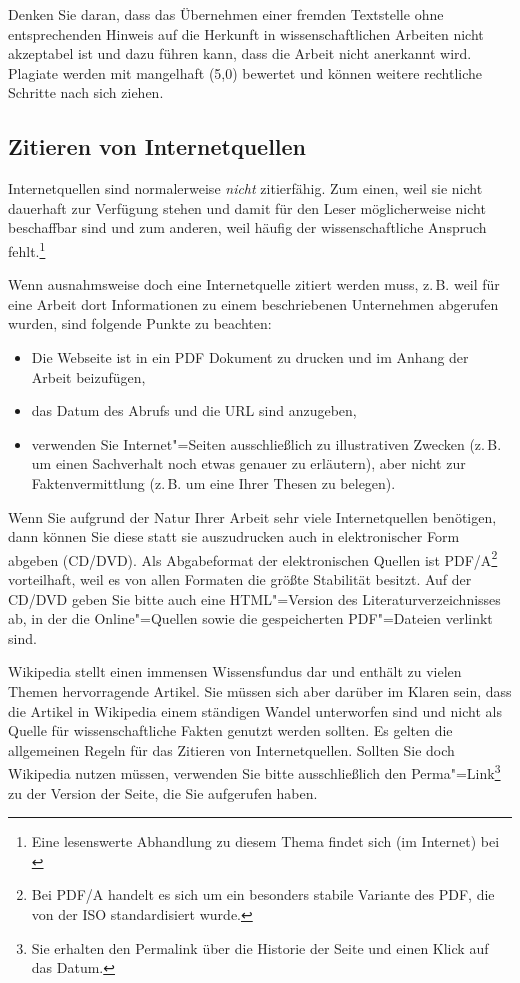 Denken Sie daran, dass das Übernehmen einer fremden Textstelle ohne entsprechenden Hinweis auf die Herkunft in wissenschaftlichen Arbeiten nicht akzeptabel ist und dazu führen kann, dass die Arbeit nicht anerkannt wird. Plagiate werden mit mangelhaft (5,0) bewertet und können weitere rechtliche Schritte nach sich ziehen.


\subsection{Zitieren von Internetquellen}

Internetquellen sind normalerweise \textit{nicht} zitierfähig. Zum einen, weil sie nicht dauerhaft zur Verfügung stehen und damit für den Leser möglicherweise nicht beschaffbar sind und zum anderen, weil häufig der wissenschaftliche Anspruch fehlt.\footnote{Eine lesenswerte Abhandlung zu diesem Thema findet sich (im Internet) bei \cite{Weber2006}}

Wenn ausnahmsweise doch eine Internetquelle zitiert werden muss, z.\,B. weil für eine Arbeit dort Informationen zu einem beschriebenen Unternehmen abgerufen wurden, sind folgende Punkte zu beachten:

\begin{itemize}
\item Die Webseite ist in ein PDF Dokument zu drucken und im Anhang der Arbeit beizufügen,
\item das Datum des Abrufs und die URL sind anzugeben,
\item verwenden Sie Internet"=Seiten ausschließlich zu illustrativen Zwecken (z.\,B. um einen Sachverhalt noch etwas genauer zu erläutern), aber nicht zur Faktenvermittlung (z.\,B. um eine Ihrer Thesen zu belegen).
\end{itemize}

Wenn Sie aufgrund der Natur Ihrer Arbeit sehr viele Internetquellen benötigen, dann können Sie diese statt sie auszudrucken auch in elektronischer Form abgeben (CD/DVD). Als Abgabeformat der elektronischen Quellen ist PDF/A\footnote{Bei PDF/A handelt es sich um ein besonders stabile Variante des \ac{PDF}, die von der  \ac{ISO} standardisiert wurde.} vorteilhaft, weil es von allen Formaten die größte Stabilität besitzt.
Auf der CD/DVD geben Sie bitte auch eine HTML"=Version des Literaturverzeichnisses ab, in der die Online"=Quellen sowie die gespeicherten PDF"=Dateien verlinkt sind.

Wikipedia stellt einen immensen Wissensfundus dar und enthält zu vielen Themen hervorragende Artikel. Sie müssen sich aber darüber im Klaren sein, dass die Artikel in Wikipedia einem ständigen Wandel unterworfen sind und nicht als Quelle für wissenschaftliche Fakten genutzt werden sollten. Es gelten die allgemeinen Regeln für das Zitieren von Internetquellen. Sollten Sie doch Wikipedia nutzen müssen, verwenden Sie bitte ausschließlich den Perma"=Link\footnote{Sie erhalten den Permalink über die Historie der Seite und einen Klick auf das Datum.} zu der Version der Seite, die Sie aufgerufen haben.


